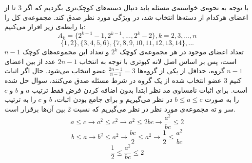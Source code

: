\p
با توجه به نحوه‌ی خواسته‌ی مسئله باید دنبال دسته‌های کوچک‌تری بگردیم که اگر 3 تا از اعضای هرکدام از دسته‌ها انتخاب شد، در ویژگی مورد نظر صدق کند. مجموعه‌ی کل را با رابطه‌ی زیر افراز می‌کنیم:
    \[A_k = \{2^{k-1}-1,2^{k-1},...,2^{k}-2\} , k=2,3,...,n\]
    \[\{1,2\}, \{3,4,5,6\}, \{7,8,9,10,11,12,13,14\}, ...\]
    تعداد اعضای موجود در هر مجموعه‌ی کوچک \(2^k\) و تعداد این مجموعه‌های کوچک
     $n-1$
     است، پس بر اساس اصل لانه کبوتری با توجه به انتخاب
     $2n-1$
     عدد  از بین اعضای
      $n-1$ 
     گروه، حداقل از یکی از گروه‌ها \(\frac{2n-1}{n-1} = 3\) عضو انتخاب می‌شود. حال اگر اثبات کنیم
      $3$ 
     عضو انتخاب شده از یک گروه در شرط مسئله صدق می‌کنند، سوال حل شده است.
     \p
    برای اثبات نامساوی مد نظر ابتدا بدون اضافه کردن فرض فقط ترتیب 
    $a$
    و
    $b$
    و
    $c$
     را به صورت \(b\leq a\leq c\) در نظر می‌گیریم و برای جامع بودن اثبات، 
    $b$
    و
    $c$
     را به ترتیب سر و ته مجموعه‌ی مورد نظر در نظر می‌گیریم که نسبت
      $2$ 
    بین آن‌ها برقرار است.
    \[a\leq c \to a^2\leq c^2 \to a^2\leq 2bc \to \frac{a^2}{bc}\leq 2\]
    \[b\leq a \to b^2\leq a^2 \to \frac{bc}{2}\leq a^2 \to \frac{1}{2}\leq\frac{a^2}{bc}\]
    \[\frac{1}{2}\leq\frac{a^2}{bc}\leq2\]